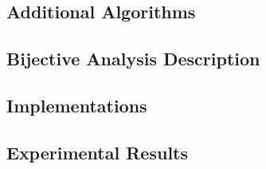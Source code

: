 \subsection{Additional Algorithms}
\label{sec:algs}


\subsection{Bijective Analysis Description}
\label{sec:bijAnalysisDesc}


\subsection{\CC Implementations}
\label{sec:implementation}


\subsection{Experimental Results}
\label{sec:exp}

